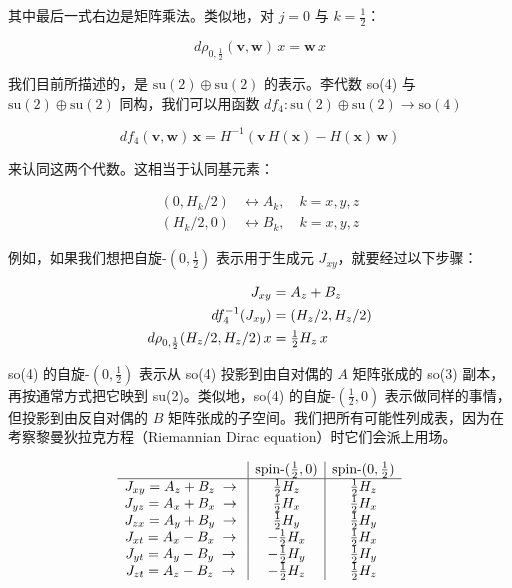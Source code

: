 其中最后一式右边是矩阵乘法。类似地，对 $j=0$ 与 $k=\tfrac12$：

\begin{equation}
d\rho_{0,\frac12}(\mathbf{v},\mathbf{w})\,x = \mathbf{w}\,x
\end{equation}

我们目前所描述的，是 $\mathrm{su}(2)\oplus\mathrm{su}(2)$ 的表示。李代数 so(4) 与 $\mathrm{su}(2)\oplus\mathrm{su}(2)$ 同构，我们可以用函数 $df_4:\mathrm{su}(2)\oplus\mathrm{su}(2)\to\mathrm{so}(4)$

\begin{equation}
df_4(\mathbf{v},\mathbf{w})\,\mathbf{x} = H^{-1}\!\left(\mathbf{v}\,H(\mathbf{x}) - H(\mathbf{x})\,\mathbf{w}\right)
\end{equation}

来认同这两个代数。这相当于认同基元素：

\begin{align}
(0, H_k/2) &\leftrightarrow A_k, \quad k=x,y,z \\
(H_k/2, 0) &\leftrightarrow B_k, \quad k=x,y,z
\end{align}

例如，如果我们想把自旋-$(0,\tfrac12)$ 表示用于生成元 $J_{xy}$，就要经过以下步骤：

\begin{align}
J_{xy} &= A_z + B_z \\
df_4^{-1}(J_{xy}) &= (H_z/2, H_z/2) \\
d\rho_{0,\frac12}(H_z/2, H_z/2)\,x &= \tfrac{1}{2} H_z\,x
\end{align}

so(4) 的自旋-$(0,\tfrac12)$ 表示从 so(4) 投影到由自对偶的 $A$ 矩阵张成的 so(3) 副本，再按通常方式把它映到 su(2)。类似地，so(4) 的自旋-$(\tfrac12,0)$ 表示做同样的事情，但投影到由反自对偶的 $B$ 矩阵张成的子空间。我们把所有可能性列成表，因为在考察黎曼狄拉克方程（Riemannian Dirac equation）时它们会派上用场。

\begin{equation}
\begin{array}{c|c|c}
 & \text{spin-}(\tfrac12,0) & \text{spin-}(0,\tfrac12) \\ \hline
J_{xy} = A_z + B_z \;\to\; & \tfrac{1}{2} H_z & \tfrac{1}{2} H_z \\
J_{yz} = A_x + B_x \;\to\; & \tfrac{1}{2} H_x & \tfrac{1}{2} H_x \\
J_{zx} = A_y + B_y \;\to\; & \tfrac{1}{2} H_y & \tfrac{1}{2} H_y \\
J_{xt} = A_x - B_x \;\to\; & -\tfrac{1}{2} H_x & \tfrac{1}{2} H_x \\
J_{yt} = A_y - B_y \;\to\; & -\tfrac{1}{2} H_y & \tfrac{1}{2} H_y \\
J_{zt} = A_z - B_z \;\to\; & -\tfrac{1}{2} H_z & \tfrac{1}{2} H_z
\end{array}
\end{equation}

